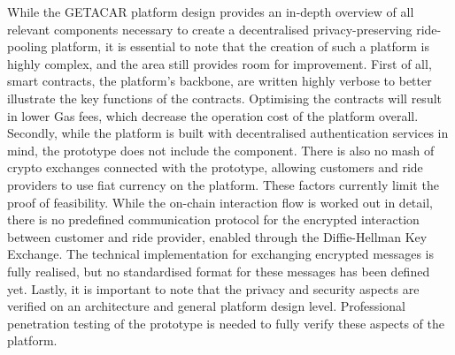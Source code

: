 While the GETACAR platform design provides an in-depth overview of all relevant components necessary to create a decentralised privacy-preserving ride-pooling platform, it is essential to note that the creation of such a platform is highly complex, and the area still provides room for improvement.
First of all, smart contracts, the platform's backbone, are written highly verbose to better illustrate the key functions of the contracts. Optimising the contracts will result in lower Gas fees, which decrease the operation cost of the platform  overall. Secondly, while the platform is built with decentralised authentication services in mind, the prototype does not include the component. There is also no mash of crypto exchanges connected with the prototype, allowing customers and ride providers to use fiat currency on the platform. These factors currently limit the proof of feasibility.
While the on-chain interaction flow is worked out in detail, there is no predefined communication protocol for the encrypted interaction between customer and ride provider, enabled through the Diffie-Hellman Key Exchange. The technical implementation for exchanging encrypted messages is fully realised, but no standardised format for these messages has been defined yet.
Lastly, it is important to note that the privacy and security aspects are verified on an architecture and general platform design level. Professional penetration testing of the prototype is needed to fully verify these aspects of the platform. 